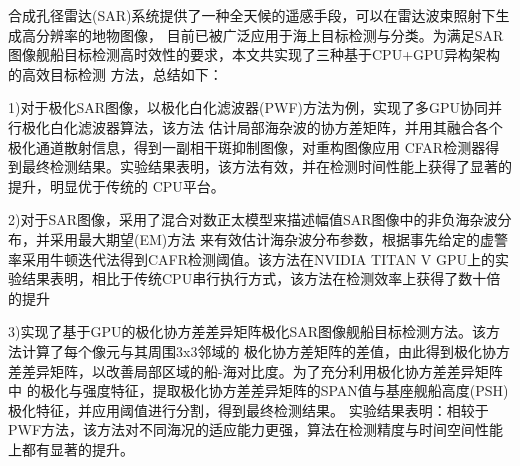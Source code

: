 \begin{cabstract}
  合成孔径雷达(SAR)系统提供了一种全天候的遥感手段，可以在雷达波束照射下生成高分辨率的地物图像，
  目前已被广泛应用于海上目标检测与分类。为满足SAR图像舰船目标检测高时效性的要求，本文共实现了三种基于CPU+GPU异构架构的高效目标检测
  方法，总结如下：

  1)对于极化SAR图像，以极化白化滤波器(PWF)方法为例，实现了多GPU协同并行极化白化滤波器算法，该方法
  估计局部海杂波的协方差矩阵，并用其融合各个极化通道散射信息，得到一副相干斑抑制图像，对重构图像应用
  CFAR检测器得到最终检测结果。实验结果表明，该方法有效，并在检测时间性能上获得了显著的提升，明显优于传统的
  CPU平台。

  2)对于SAR图像，采用了混合对数正太模型来描述幅值SAR图像中的非负海杂波分布，并采用最大期望(EM)方法
  来有效估计海杂波分布参数，根据事先给定的虚警率采用牛顿迭代法得到CAFR检测阈值。该方法在NVIDIA TITAN
  V GPU上的实验结果表明，相比于传统CPU串行执行方式，该方法在检测效率上获得了数十倍的提升

  3)实现了基于GPU的极化协方差差异矩阵极化SAR图像舰船目标检测方法。该方法计算了每个像元与其周围3x3邻域的
  极化协方差矩阵的差值，由此得到极化协方差差异矩阵，以改善局部区域的船-海对比度。为了充分利用极化协方差差异矩阵中
  的极化与强度特征，提取极化协方差差异矩阵的SPAN值与基座舰船高度(PSH)极化特征，并应用阈值进行分割，得到最终检测结果。
  实验结果表明：相较于PWF方法，该方法对不同海况的适应能力更强，算法在检测精度与时间空间性能上都有显著的提升。

\end{cabstract}


